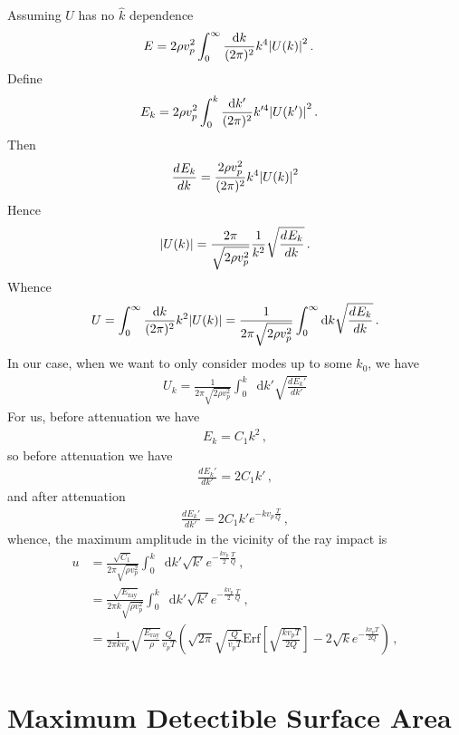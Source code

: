 \documentclass{article}
\newcommand*\diff{\mathop{}\!\mathrm{d}}
\newcommand*\te[1]{\text{#1}}
\newcommand*\p[1]{\left(#1\right)}
\newcommand*\ps[1]{\left[#1\right]}
\newcommand*\f[2]{\frac{#1}{#2}}
\newcommand*\td[3]{\frac{d^{#3}#1}{d #2^{#3}}}
\begin{document}
Assuming $U$ has no $\hat k$ dependence
\begin{align}
E&=2\rho v_p^2\int_{0}^{\infty}\f{\diff k}{(2\pi)^2}k^4\abs{U(k)}^2\,.
\end{align}
Define
\begin{align}
E_k &=2\rho v_p^2\int_{0}^{k}\f{\diff k'}{(2\pi)^2}k'^4\abs{U(k')}^2\,.
\end{align}
Then
\begin{align}
\td{E_k}{k}{} =\f{2\rho v_p^2}{(2\pi)^2}k^4\abs{U(k)}^2
\end{align}
Hence
\begin{align}
\abs{U(k)} = \f{2\pi}{\sqrt{2\rho v_p^2}}\f{1}{k^2}\sqrt{\td{E_k}{k}{}}\,.
\end{align}
Whence
\begin{align}
U = \int_0^\infty \f{\diff k}{(2\pi)^2} k^2\abs{U(k)} = \f{1}{2\pi\sqrt{2\rho v_p^2}}\int_0^\infty\diff k\sqrt{\td{E_k}{k}{}}\,.
\end{align}
In our case, when we want to only consider modes up to some $k_0$, we have
\begin{align}
U_k =  \f{1}{2\pi\sqrt{2\rho v_p^2}}\int_0^k\diff k'\sqrt{\td{E_k'}{k'}{}}
\end{align}
For us, before attenuation we have
\begin{align}
E_k = C_1 k^2\,,
\end{align}
so before attenuation we have
\begin{align}
\td{E_k'}{k'}{} = 2 C_1 k'\,,
\end{align}
and after attenuation
\begin{align}
\td{E_k'}{k'}{} = 2 C_1 k'e^{-k v_p\f{T}{Q}}\,,
\end{align}
whence, the maximum amplitude in the vicinity of the ray impact is
\begin{align}
u &=  \f{\sqrt{C_1}}{2\pi\sqrt{\rho v_p^2}}\int_0^k\diff k' \sqrt{k'}e^{-\f{k v_p}{2}\f{T}{Q}}\,,\\
&=\f{\sqrt{E_{\te{ray}}}}{2\pi k\sqrt{\rho v_p^2}}\int_0^k\diff k' \sqrt{k'}e^{-\f{k v_p}{2}\f{T}{Q}}\,,\\
&=\f{1}{2\pi kv_p}\sqrt{\f{E_{\te{ray}}}{\rho}}\f{Q}{v_p T}\p{\sqrt{2\pi}\sqrt{ \f{Q}{v_p T}}\te{Erf}\ps{\sqrt{\f{k v_p T}{2 Q}}} -2\sqrt{k} e^{-\f{k v_p T}{2 Q}}}\,,\\
\end{align}
\pagebreak
\section{Maximum Detectible Surface Area}
\indent
\end{document}
